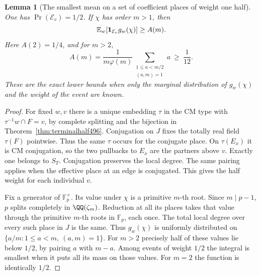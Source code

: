 \documentclass[a4paper,11pt]{article}
\newtheorem{lemma}[proposition]{Lemma}
\theoremstyle{definition}
\theoremstyle{remark}
\numberwithin{equation}{section}
\begin{document}
\begin{lemma}[The smallest mean on a set of coefficient places of weight one half]\leavevmode
\label{lem:halfgauss504}
One has \(\Pr(\mathcal E_v)=1/2\). If \(\chi\) has order \(m>1\),
then
\[
       \mathbb E_w[{\bf1}_{\mathcal E_v}g_w(\chi)]\ge A(m).
\]
Here \(A(2)=1/4\), and for \(m>2\),
\[
 A(m)=\frac{1}{m\varphi(m)}
              \sum_{\substack{1\le a<m/2\\(a,m)=1}}a
                         \ \ge\ \frac1{12}.
\]
These are the exact lower bounds when only the marginal
distribution of \(g_w(\chi)\) and the weight of the event are known.
\end{lemma}
\begin{proof}
For fixed \(w,v\) there is a unique embedding \(\tau\) in the
CM type with \(\tau^{-1}w\cap F=v\), by complete splitting and
the bijection in Theorem~\ref{thm:terminalhalf496}. Conjugation
on \(J\) fixes the totally real field \(\tau(F)\) pointwise.
Thus the same \(\tau\) occurs for the conjugate place. On
\(\tau(E_x)\) it is CM conjugation, so the two pullbacks to
\(E_x\) are the partners above \(v\). Exactly one belongs
to \(S_T\). Conjugation preserves the local degree. The same
pairing applies when the effective place at an edge is conjugated.
This gives the half weight for each individual \(v\).

Fix a generator of \(\mathbb F_p^\times\). Its value under \(\chi\)
is a primitive \(m\)-th root. Since \(m\mid p-1\), \(p\) splits
completely in \(\QQ(\zeta_m)\). Reduction at all its places takes
that value through the primitive \(m\)-th roots in \(\mathbb F_p\),
each once. The total local degree over every such place in \(J\)
is the same. Thus \(g_w(\chi)\) is uniformly distributed on
\(\{a/m:1\le a<m,\ (a,m)=1\}\). For \(m>2\) precisely half
of these values lie below \(1/2\), by pairing \(a\) with \(m-a\).
Among events of weight \(1/2\) the integral is smallest when
it puts all its mass on those values. For \(m=2\) the function
is identically \(1/2\).


\end{proof}
\end{document}
